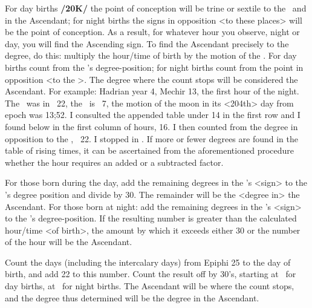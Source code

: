 For day births \textbf{/20K/} the point of conception will be trine or sextile to the \Sun\, and in the Ascendant; for night births the signs in opposition <to these places> will be the point of conception. As a result, for whatever hour you observe, night or day, you will find the Ascending sign.
To find the Ascendant precisely to the degree, do this: multiply the hour/time of birth by the motion of the \Moon. For day births count from the \Sun’s degree-position; for night births count from the point in opposition <to the \Sun>. The degree where the count stops will be considered the Ascendant. For example: Hadrian year 4, Mechir 13, the first hour of the night. The \Sun\, was in \Aquarius\, 22\deg, the \Moon\, is
\Scorpio\, 7\deg, the motion of the moon in its <204th> day from epoch was 13;52\deg. I consulted the appended
table under 14 in the first row and I found below in the first column of hours, 16. I then counted from the degree in opposition to the \Sun, \Leo\, 22\deg. I stopped in \deg. If more or fewer degrees are found in the table of rising times, it can be ascertained from the aforementioned procedure whether the hour requires an added or a subtracted factor.

For those born during the day, add the remaining degrees in the \Sun’s <sign> to the \Moon’s degree position and divide by 30. The remainder will be the <degree in> the Ascendant. For those born at night: add the remaining degrees in the \Moon’s <sign> to the \Sun’s degree-position. If the resulting number is
greater than the calculated hour/time <of birth>, the amount by which it exceeds either 30 or the number of the hour will be the Ascendant.

Count the days (including the intercalary days) from Epiphi 25 to the day of birth, and add 22 to this number. Count the result off by 30’s, starting at \Cancer\, for day births, at \Capricorn\, for night births. The Ascendant will be where the count stops, and the degree thus determined will be the degree in the Ascendant.

\newpage
